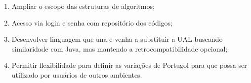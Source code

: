 \begin{enumerate}

\item Ampliar o escopo das estruturas de algoritmos;
\item Acesso via login e senha com repositório dos códigos;
\item Desenvolver linguagem que una e venha a substituir a UAL buscando similaridade com Java, mas mantendo a retrocompatibilidade opcional;
\item Permitir flexibilidade para definir as variações de Portugol para que possa ser utilizado por usuários de outros ambientes.

\end{enumerate}
